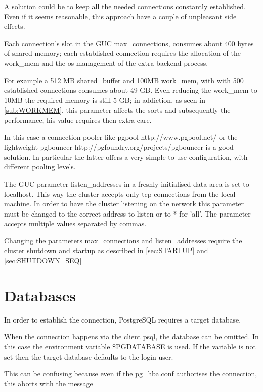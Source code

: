 A solution could be to keep all the needed connections 
constantly established. Even if it seems reasonable, this approach have a 
couple of unpleasant side effects.

Each connection's slot in the GUC max\_connections, consumes about 400 bytes of 
shared memory; each established connection requires the allocation of the 
work\_mem and the os management of the extra backend process. \newline

For example a 512 MB shared\_buffer and 100MB work\_mem, with with 500 
established connections consumes  about 49 GB. Even reducing the work\_mem to 
10MB the required memory is still 5 GB; in addiction, as seen 
in \ref{sub:WORKMEM}, this parameter affects the sorts and subsequently the 
performance, his value requires then extra care.

In this case a connection pooler like pgpool http://www.pgpool.net/ or the 
lightweight pgbouncer http://pgfoundry.org/projects/pgbouncer is a 
good solution. In particular the latter offers a very simple to use 
configuration, with different pooling levels. 

The GUC parameter listen\_addresses in a freshly initialised 
data area is set to localhost. This way the cluster accepts only tcp 
connections from the local machine. In order to have the cluster listening on 
the network this parameter must be changed to the correct address to listen 
or to * for 'all'. The parameter accepts multiple values separated by commas.

Changing the parameters max\_connections and listen\_addresses require the 
cluster shutdown and startup as described in \ref{sec:STARTUP} and 
\ref{sec:SHUTDOWN_SEQ}



\section{Databases}
\label{sec:DATABASES}
In order to establish the connection, PostgreSQL requires a 
target database.

When the connection happens via the client psql, the database can be omitted. 
In this case the environment variable \$PGDATABASE  is used. If the variable is not set then the target database defaults 
to the login user.

This can be confusing because even if the pg\_hba.conf authorises 
the connection, this aborts with the message 

